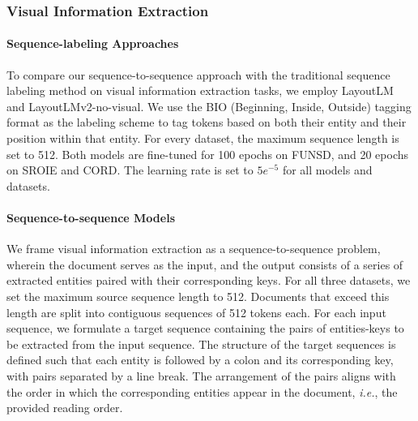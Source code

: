 \subsubsection{Visual Information Extraction}
\label{section:experimental-settings-visual-information-extraction}

\paragraph{Sequence-labeling Approaches}

To compare our sequence-to-sequence approach with the traditional sequence labeling method on visual information extraction tasks, we employ LayoutLM and LayoutLMv2-no-visual. We use the BIO (Beginning, Inside, Outside) tagging format \citep{ramshaw1999text} as the labeling scheme to tag tokens based on both their entity and their position within that entity. For every dataset, the maximum sequence length is set to 512. Both models are fine-tuned for 100 epochs on FUNSD, and 20 epochs on SROIE and CORD. The learning rate is set to $5e^{-5}$ for all models and datasets.

\paragraph{Sequence-to-sequence Models} 

We frame visual information extraction as a sequence-to-sequence problem, wherein the document serves as the input, and the output consists of a series of extracted entities paired with their corresponding keys. For all three datasets, we set the maximum source sequence length to 512. Documents that exceed this length are split into contiguous sequences of 512 tokens each. For each input sequence, we formulate a target sequence containing the pairs of entities-keys to be extracted from the input sequence. The structure of the target sequences is defined such that each entity is followed by a colon and its corresponding key, with pairs separated by a line break. The arrangement of the pairs aligns with the order in which the corresponding entities appear in the document, \textit{i.e.}, the provided reading order.

